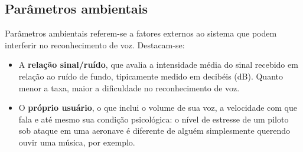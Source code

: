 
\subsection{Parâmetros ambientais}

Parâmetros ambientais referem-se a fatores externos ao sistema que podem interferir no reconhecimento de voz. Destacam-se:

\begin{itemize}
\item A \textbf{relação sinal/ruído}, que avalia a intensidade média do sinal recebido em relação ao ruído de fundo, tipicamente medido em decibéis (dB). Quanto menor a taxa, maior a dificuldade no reconhecimento de voz.

\item O \textbf{próprio usuário}, o que inclui o volume de sua voz, a velocidade com que fala e até mesmo sua condição psicológica: o nível de estresse de um piloto sob ataque em uma aeronave é diferente de alguém simplesmente querendo ouvir uma música, por exemplo.
\end{itemize}
